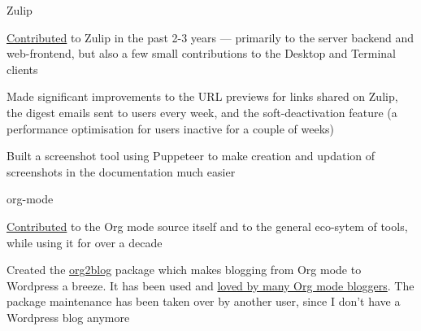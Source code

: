 
\begin{cventries}

  \cventry
      {Zulip }
      {}
      {} %
      {} %
      {
        \begin{cvitems} %
        \item {\href{https://github.com/zulip/zulip/commits?author=punchagan}{Contributed} to Zulip in the past 2-3 years --- primarily to the server backend and web-frontend, but also a few small contributions to the Desktop and Terminal clients}
        \item {Made significant improvements to the URL previews for links shared on Zulip, the digest emails sent to users every week, and the soft-deactivation feature (a performance optimisation for users inactive for a couple of weeks)}
        \item {Built a screenshot tool using Puppeteer to make creation and updation of screenshots in the documentation much easier}
        \end{cvitems}
      }
  \cventry
      {org-mode }
      {}
      {} %
      {} %
      {
        \begin{cvitems} %
        \item{\href{https://github.com/bzg/org-mode/commits?author=punchagan}{Contributed} to the Org mode source itself and to the general eco-sytem of tools, while using it for over a decade}
        \item{Created the \href{https://github.com/org2blog/org2blog/commits?author=punchagan}{org2blog} package which makes blogging from Org mode to Wordpress a breeze. It has been used and \href{https://github.com/org2blog/org2blog/blob/7749665c83df2016d960d31318f483b30fa7d1e8/README.org\#testimonials}{loved by many Org mode bloggers}. The package maintenance has been taken over by another user, since I don't have a Wordpress blog anymore}

\end{cvitems}}
\end{cventries}

